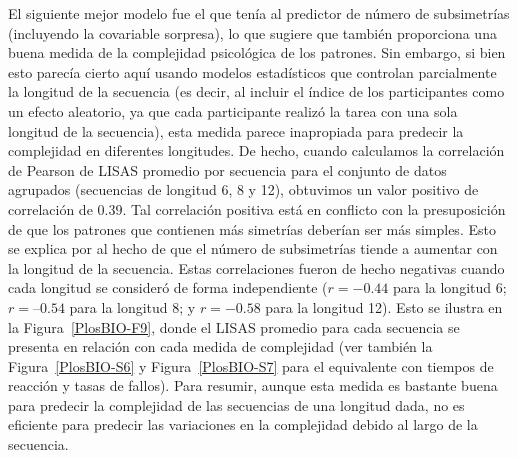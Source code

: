 El siguiente mejor modelo fue el que tenía al predictor de número de subsimetrías (incluyendo la covariable sorpresa), lo que sugiere que también proporciona una buena medida de la complejidad psicológica de los patrones. Sin embargo, si bien esto parecía cierto aquí usando modelos estadísticos que controlan parcialmente la longitud de la secuencia (es decir, al incluir el índice de los participantes como un efecto aleatorio, ya que cada participante realizó la tarea con una sola longitud de la secuencia), esta medida parece inapropiada para predecir la complejidad en diferentes longitudes. De hecho, cuando calculamos la correlación de Pearson de LISAS promedio por secuencia para el conjunto de datos agrupados (secuencias de longitud 6, 8 y 12), obtuvimos un valor positivo de correlación de $0.39$. Tal correlación positiva está en conflicto con la presuposición de que los patrones que contienen más simetrías deberían ser más simples. Esto se explica por al hecho de que el número de subsimetrías tiende a aumentar con la longitud de la secuencia. Estas correlaciones fueron de hecho negativas cuando cada longitud se consideró de forma independiente ($r = -0.44$ para la longitud 6; $r= –0.54$ para la longitud 8; y $r = -0.58$ para la longitud 12). Esto se ilustra en la Figura~\ref{PlosBIO-F9}, donde el LISAS promedio para cada secuencia se presenta en relación con cada medida de complejidad (ver también la Figura~\ref{PlosBIO-S6} y Figura~\ref{PlosBIO-S7} para el equivalente con tiempos de reacción y tasas de fallos). Para resumir, aunque esta medida es bastante buena para predecir la complejidad de las secuencias de una longitud dada, no es eficiente para predecir las variaciones en la complejidad debido al largo de la secuencia.


